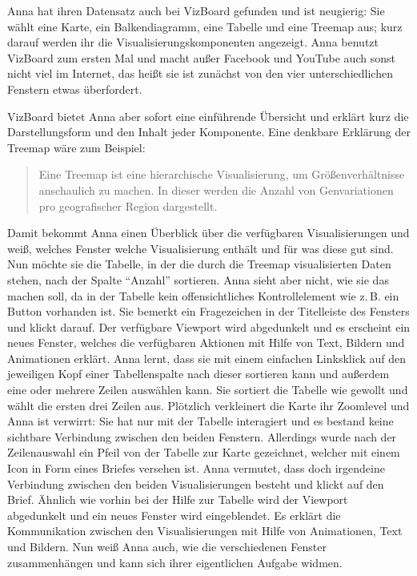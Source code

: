\documentclass[
	headsepline,
	footsepline,
	fontsize=12pt,
	bibliography=totoc
]{scrbook}
\begin{document}

Anna hat ihren Datensatz auch bei VizBoard gefunden und ist neugierig: Sie wählt eine Karte, ein Balkendiagramm, eine Tabelle und eine Treemap aus; kurz darauf werden ihr die Visualisierungskomponenten angezeigt. Anna benutzt VizBoard zum ersten Mal und macht außer Facebook und YouTube auch sonst nicht viel im Internet, das heißt sie ist zunächst von den vier unterschiedlichen Fenstern etwas überfordert.

VizBoard bietet Anna aber sofort eine einführende Übersicht und erklärt kurz die Darstellungsform und den Inhalt jeder Komponente. Eine denkbare Erklärung der Treemap wäre zum Beispiel:

\begin{quote}
Eine Treemap ist eine hierarchische Visualisierung, um Größenverhältnisse anschaulich zu machen. In dieser werden die Anzahl von Genvariationen pro geografischer Region dargestellt.
\end{quote}


Damit bekommt Anna einen Überblick über die verfügbaren Visualisierungen und weiß, welches Fenster welche Visualisierung enthält und für was diese gut sind. Nun möchte sie die Tabelle, in der die durch die Treemap visualisierten Daten stehen, nach der Spalte \enquote{Anzahl} sortieren. Anna sieht aber nicht, wie sie das machen soll, da in der Tabelle kein offensichtliches Kontrollelement wie z.\,B. ein Button vorhanden ist. Sie bemerkt ein Fragezeichen in der Titelleiste des Fensters und klickt darauf. Der verfügbare Viewport wird abgedunkelt und es erscheint ein neues Fenster, welches die verfügbaren Aktionen mit Hilfe von Text, Bildern und Animationen erklärt. Anna lernt, dass sie mit einem einfachen Linksklick auf den jeweiligen Kopf einer Tabellenspalte nach dieser sortieren kann und außerdem eine oder mehrere Zeilen auswählen kann. Sie sortiert die Tabelle wie gewollt und wählt die ersten drei Zeilen aus. Plötzlich verkleinert die Karte ihr Zoomlevel und Anna ist verwirrt: Sie hat nur mit der Tabelle interagiert und es bestand keine sichtbare Verbindung zwischen den beiden Fenstern. Allerdings wurde nach der Zeilenauswahl ein Pfeil von der Tabelle zur Karte gezeichnet, welcher mit einem Icon in Form eines Briefes versehen ist. Anna vermutet, dass doch irgendeine Verbindung zwischen den beiden Visualisierungen besteht und klickt auf den Brief. Ähnlich wie vorhin bei der Hilfe zur Tabelle wird der Viewport abgedunkelt und ein neues Fenster wird eingeblendet. Es erklärt die Kommunikation zwischen den Visualisierungen mit Hilfe von Animationen, Text und Bildern. Nun weiß Anna auch, wie die verschiedenen Fenster zusammenhängen und kann sich ihrer eigentlichen Aufgabe widmen.
\end{document}
